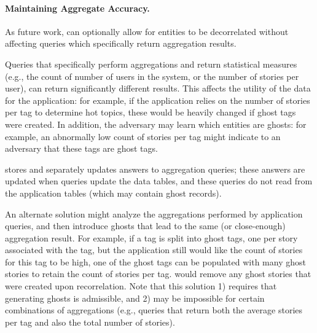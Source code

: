 \paragraph{Maintaining Aggregate Accuracy.}
As future work, \sys can optionally allow for entities to be decorrelated without affecting queries which
specifically return aggregation results.

Queries that specifically perform aggregations and return statistical measures (e.g.,
the count of number of users in the system, or the number of stories per user), can return
significantly different results. This affects the utility of the data for the application: for
example, if the application relies on the number of stories per tag to determine hot topics, these
would be heavily changed if ghost tags were created.  In addition, the adversary may learn which
entities are ghosts: for example, an abnormally low count of stories per tag might indicate to an
adversary that these tags are ghost tags.  

\sys stores and separately updates answers to aggregation queries;
these answers are updated when queries update the data tables, and these queries do not read from
the application tables (which may contain ghost records).

An alternate solution might analyze the aggregations performed by application queries, and then
introduce ghosts that lead to the same (or close-enough) aggregation result. For example, if a tag
is split into ghost tags, one per story associated with the tag, but the application still would
like the count of stories for this tag to be high, one of the ghost tags can be populated with many
ghost stories to retain the count of stories per tag.  \sys would remove any ghost stories that
were created upon recorrelation. Note that this solution 1) requires that generating ghosts is
admissible, and 2) may be impossible for certain combinations of aggregations (e.g., queries that
return both the average stories per tag and also the total number of stories).


\fi
